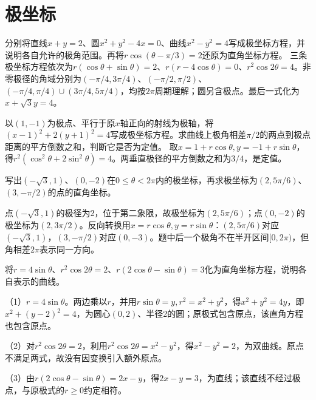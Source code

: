 \par\addvspace{12pt}

\section{极坐标}

分别将直线\(x+y=2\)、圆\(x^2+y^2-4x=0\)、曲线\(x^2-y^2=4\)写成极坐标方程，并说明各自允许的极角范围。再将\(r\cos(\theta-\pi/3)=2\)还原为直角坐标方程。
\solutionanswer
三条极坐标方程依次为\(r(\cos\theta+\sin\theta)=2\)、\(r(r-4\cos\theta)=0\)、\(r^2\cos2\theta=4\)。非零极径的角域分别为\((-\pi/4,3\pi/4)\)、\((-\pi/2,\pi/2)\)、\((-\pi/4,\pi/4)\cup(3\pi/4,5\pi/4)\)，均按\(2\pi\)周期理解；圆另含极点。最后一式化为\(x+\sqrt3y=4\)。


以\((1,-1)\)为极点、平行于原\(x\)轴正向的射线为极轴，将\((x-1)^2+2(y+1)^2=4\)写成极坐标方程。求曲线上极角相差\(\pi/2\)的两点到极点距离的平方倒数之和，判断它是否为定值。
\solutionanswer
取\(x=1+r\cos\theta,y=-1+r\sin\theta\)，得\(r^2(\cos^2\theta+2\sin^2\theta)=4\)。两垂直极径的平方倒数之和为\(3/4\)，是定值。


写出\((-\sqrt3,1)\)、\((0,-2)\)在\(0\le\theta<2\pi\)内的极坐标，再求极坐标为\((2,5\pi/6)\)、\((3,-\pi/2)\)的点的直角坐标。
\par
\solutionanswer
点\((-\sqrt3,1)\)的极径为2，位于第二象限，故极坐标为\((2,5\pi/6)\)；点\((0,-2)\)的极坐标为\((2,3\pi/2)\)。反向转换用\(x=r\cos\theta,y=r\sin\theta\)：\((2,5\pi/6)\)对应\((-\sqrt3,1)\)，\((3,-\pi/2)\)对应\((0,-3)\)。题中后一个极角不在半开区间\([0,2\pi)\)，但角相差\(2\pi\)表示同一方向。


将\(r=4\sin\theta\)、\(r^2\cos2\theta=2\)、\(r(2\cos\theta-\sin\theta)=3\)化为直角坐标方程，说明各自表示的曲线。
\par
\solutionanswer
（1）\(r=4\sin\theta\)。两边乘以\(r\)，并用\(r\sin\theta=y,r^2=x^2+y^2\)，得\(x^2+y^2=4y\)，即\(x^2+(y-2)^2=4\)，为圆心\((0,2)\)、半径2的圆；原极式包含原点，该直角方程也包含原点。

（2）对\(r^2\cos2\theta=2\)，利用\(r^2\cos2\theta=x^2-y^2\)，得\(x^2-y^2=2\)，为双曲线。原点不满足两式，故没有因变换引入额外原点。

（3）由\(r(2\cos\theta-\sin\theta)=2x-y\)，得\(2x-y=3\)，为直线；该直线不经过极点，与原极式的\(r\ge0\)约定相符。


